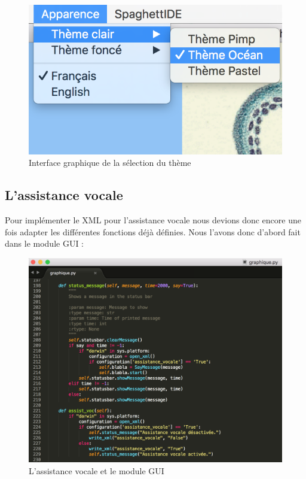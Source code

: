 \documentclass[a4paper,12pt]{article}
\begin{document}
\begin{figure}[h!]
			\begin{center}
				\includegraphics[scale=0.6]{images/themes_selection.png}
				\caption{Interface graphique de la sélection du thème}
			\end{center}
		\end{figure}

\subsection{L'assistance vocale}

Pour implémenter le XML pour l'assistance vocale nous devions donc encore une fois adapter les différentes fonctions déjà définies. Nous l'avons donc d'abord fait dans le module GUI : 

\begin{figure}[h!]
			\begin{center}
				\includegraphics[scale=0.45]{images/gui.png}
				\caption{L'assistance vocale et le module GUI}
			\end{center}
		\end{figure}
\end{document}
